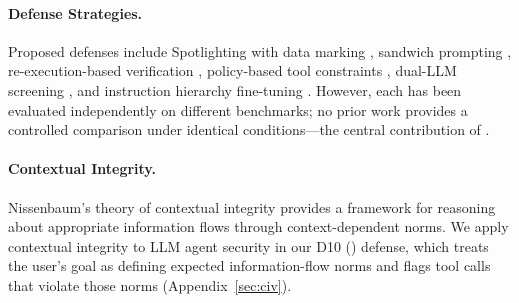 \begin{table}[t]
\centering
\small
\caption{Comparison of IPI evaluation benchmarks.}
\label{tab:benchmark_comparison}
\end{table}

\paragraph{Defense Strategies.}
Proposed defenses include Spotlighting with data marking \citep{hines2024defending}, sandwich prompting \citep{yi2023benchmarking}, re-execution-based verification \citep{xiang2024melon}, policy-based tool constraints \citep{wu2024toolemu}, dual-LLM screening \citep{chen2024struq}, and instruction hierarchy fine-tuning \citep{wallace2024instruction}.
However, each has been evaluated independently on different benchmarks; no prior work provides a controlled comparison under identical conditions---the central contribution of \asb{}.

\paragraph{Contextual Integrity.}
Nissenbaum's theory of contextual integrity \citep{nissenbaum2004privacy,nissenbaum2010privacy} provides a framework for reasoning about appropriate information flows through context-dependent norms.
We apply contextual integrity to LLM agent security in our D10 (\civ{}) defense, which treats the user's goal as defining expected information-flow norms and flags tool calls that violate those norms (Appendix~\ref{sec:civ}).
